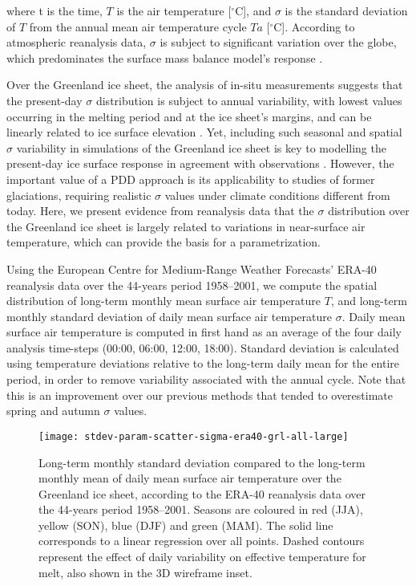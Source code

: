 \documentclass[review]{igs}
\begin{document}
where t is the time, $T$ is the air temperature [$^\circ$C], and $\sigma$ is the standard deviation of $T$ from the annual mean air temperature cycle $Ta$ [$^\circ$C]. According to atmospheric reanalysis data, $\sigma$ is subject to significant variation over the globe, which predominates the surface mass balance model’s response \citep{seguinot-2013}.

Over the Greenland ice sheet, the analysis of in-situ measurements suggests that the present-day $\sigma$ distribution is subject to annual variability, with lowest values occurring in the melting period and at the ice sheet's margins, and can be linearly related to ice surface elevation \citep{fausto-etal-2009,fausto-etal-2011}. Yet, including such seasonal and spatial $\sigma$ variability in simulations of the Greenland ice sheet is key to modelling the present-day ice surface response in agreement with observations \citep{rogozhina-rau-inpress}. However, the important value of a PDD approach is its applicability to studies of former glaciations, requiring realistic $\sigma$ values under climate conditions different from today. Here, we present evidence from reanalysis data that the $\sigma$ distribution over the Greenland ice sheet is largely related to variations in near-surface air temperature, which can provide the basis for a parametrization.

Using the European Centre for Medium-Range Weather Forecasts’ ERA-40 reanalysis data \citep{uppala-etal-2005} over the 44-years period 1958–2001, we compute the spatial distribution of long-term monthly mean surface air temperature $T$, and long-term monthly standard deviation of daily mean surface air temperature $\sigma$. Daily mean surface air temperature is computed in first hand as an average of the four daily analysis time-steps (00:00, 06:00, 12:00, 18:00). Standard deviation is calculated using temperature deviations relative to the long-term daily mean for the entire period, in order to remove variability associated with the annual cycle. Note that this is an improvement over our previous methods \citep{seguinot-2013,rogozhina-rau-inpress} that tended to overestimate spring and autumn $\sigma$ values.

\begin{figure*}
    \centering\texttt{[image: stdev-param-scatter-sigma-era40-grl-all-large]}
    \caption{Long-term monthly standard deviation compared to the long-term monthly mean of daily mean surface air temperature over the Greenland ice sheet, according to the ERA-40 reanalysis data \citep{uppala-etal-2005} over the 44-years period 1958–2001. Seasons are coloured in red (JJA), yellow (SON), blue (DJF) and green (MAM). The solid line corresponds to a linear regression over all points. Dashed contours represent the effect of daily variability on effective temperature for melt, also shown in the 3D wireframe inset.}
    \label{fig:grl}
\end{figure*}
\end{document}
